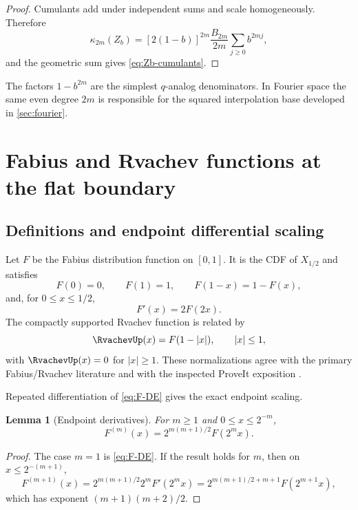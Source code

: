 \documentclass[11pt,oneside]{article}
\numberwithin{equation}{section}
\newtheorem{lemma}[lemma]{Lemma}
\theoremstyle{definition}
\theoremstyle{remark}
\begin{document}
\begin{proof}
Cumulants add under independent sums and scale homogeneously.  Therefore
\[
 \kappa_{2m}(Z_b)
 =[2(1-b)]^{2m}\frac{B_{2m}}{2m}
 \sum_{j\ge0}b^{2mj},
\]
and the geometric sum gives \eqref{eq:Zb-cumulants}.
\end{proof}

The factors $1-b^{2m}$ are the simplest $q$-analog denominators.  In Fourier
space the same even degree $2m$ is responsible for the squared interpolation
base developed in \cref{sec:fourier}.

\section{Fabius and Rvachev functions at the flat boundary}
\label{sec:fabius}

\subsection{Definitions and endpoint differential scaling}

Let $F$ be the Fabius distribution function on $[0,1]$.  It is the CDF of
$X_{1/2}$ and satisfies
\begin{equation}
 F(0)=0,\qquad F(1)=1,\qquad F(1-x)=1-F(x),
 \label{eq:F-symmetry}
\end{equation}
and, for $0\le x\le1/2$,
\begin{equation}
 F'(x)=2F(2x).
 \label{eq:F-DE}
\end{equation}
The compactly supported Rvachev function is related by
\begin{equation}
 \RvachevUp(x)=F(1-|x|),\qquad |x|\le1,
 \label{eq:Up-F}
\end{equation}
with $\RvachevUp(x)=0$ for $|x|\ge1$.  These normalizations agree with the primary
Fabius/Rvachev literature \cite{Fabius1966,Rvachev1990,AriasDeReyna} and with
the inspected ProveIt exposition \cite{ProveItFabius}.

Repeated differentiation of \eqref{eq:F-DE} gives the exact endpoint scaling.

\begin{lemma}[Endpoint derivatives]
For $m\ge1$ and $0\le x\le2^{-m}$,
\begin{equation}
 F^{(m)}(x)=2^{m(m+1)/2}F(2^mx).
 \label{eq:F-derivatives}
\end{equation}
\end{lemma}

\begin{proof}
The case $m=1$ is \eqref{eq:F-DE}.  If the result holds for $m$, then on
$x\le2^{-(m+1)}$,
\[
 F^{(m+1)}(x)=2^{m(m+1)/2}2^mF'(2^mx)
 =2^{m(m+1)/2+m+1}F(2^{m+1}x),
\]
which has exponent $(m+1)(m+2)/2$.
\end{proof}
\end{document}
